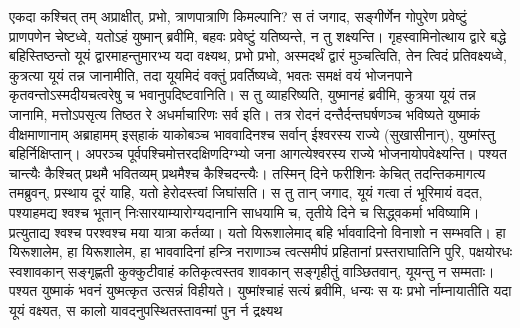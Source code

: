 \vakya एकदा कश्चित् तम् अप्राक्षीत्, प्रभो, त्राणपात्राणि किमल्पानि?
\vakya स तं जगाद, सङ्गीर्णेन गोपुरेण प्रवेष्टुं प्राणपणेन चेष्टध्वे, यतोऽहं युष्मान् ब्रवीमि, बहवः प्रवेष्टुं यतिष्यन्ते, न तु शक्ष्यन्ति।
\vakya गृहस्वामिनोत्थाय द्वारे बद्धे बहिस्तिष्ठन्तो यूयं द्वारमाहन्तुमारभ्य यदा वक्ष्यथ, प्रभो प्रभो, अस्मदर्थं द्वारं मुञ्चत्विति, तेन त्विदं प्रतिवक्ष्यध्वे, कुत्रत्या यूयं तन्न जानामीति,
\vakya तदा यूयमिदं वक्तुं प्रवर्तिष्यध्वे, भवतः समक्षं वयं भोजनपाने कृतवन्तोऽस्मदीयचत्वरेषु च भवानुपदिष्टवानिति।
\vakya स तु व्याहरिष्यति, युष्मानहं ब्रवीमि, कुत्रया यूयं तन्न जानामि, मत्तोऽपसृत्य तिष्ठत रे अधर्माचारिणः सर्व इति।
\vakya तत्र रोदनं दन्तैर्दन्तघर्षणञ्च भविष्यते युष्माकं वीक्षमाणानाम् अब्राहामम् इस्‌हाकं याकोबञ्च भाववादिनश्च सर्वान् ईश्वरस्य राज्ये (सुखासीनान्), युष्मांस्तु बहिर्निक्षिप्तान्।
\vakya अपरञ्च पूर्वपश्चिमोत्तरदक्षिणदिग्भ्यो जना आगत्येश्वरस्य राज्ये भोजनायोपवेक्ष्यन्ति।
\vakya पश्यत चान्त्यैः कैश्चित् प्रथमै भवितव्यम् प्रथमैश्च कैश्चिदन्त्यैः।
\vakya तस्मिन् दिने फरीशिनः केचित् तदन्तिकमागत्य तमब्रुवन्, प्रस्थाय दूरं याहि, यतो हेरोदस्त्वां जिघांसति।
\vakya स तु तान् जगाद, यूयं गत्वा तं भूरिमायं वदत, पश्याहमद्य श्वश्च भूतान् निःसारयाम्यारोग्यदानानि साधयामि च, तृतीये दिने च सिद्ध्वकर्मा भविष्यामि।
\vakya प्रत्युताद्य श्वश्च परश्वश्च मया यात्रा कर्तव्या। यतो यिरूशालेमाद् बहि र्भाववादिनो विनाशो न सम्भवति।
\vakya हा यिरूशालेम, हा यिरूशालेम, हा भाववादिनां हन्त्रि नराणाञ्च त्वत्समीपं प्रहितानां प्रस्तराघातिनि पुरि, पक्षयोरधः स्वशावकान् सङ्गृह्णती कुक्कुटीवाहं कतिकृत्वस्तव शावकान् सङ्गृहीतुं वाञ्छितवान्, यूयन्तु न सम्मताः।
\vakya पश्यत युष्माकं भवनं युष्मत्कृत उत्सन्नं विहीयते। युष्मांश्चाहं सत्यं ब्रवीमि, धन्यः स यः प्रभो र्नाम्नायातीति यदा यूयं वक्ष्यत, स कालो यावदनुपस्थितस्तावन्मां पुन र्न द्रक्ष्यथ\eoc